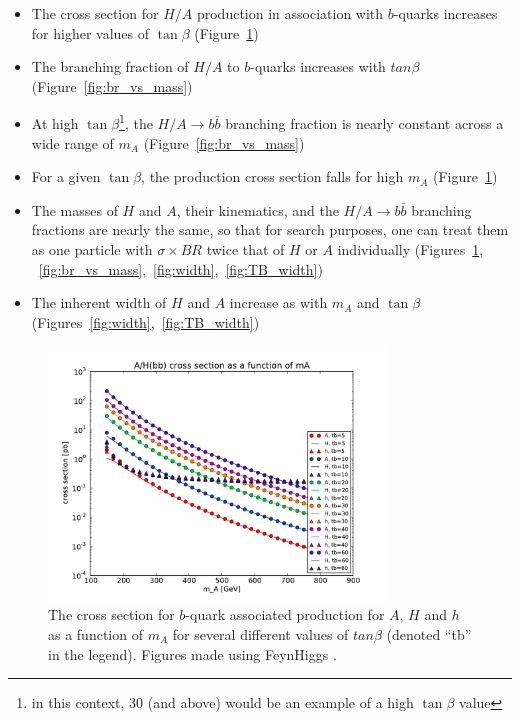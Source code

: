 \begin{itemize}
	\item The cross section for $H/A$ production in association 
        with $b$-quarks increases for higher values of $\tan\beta$ (Figure~\ref{fig:xsec_vs_mass})
	\item The branching fraction of $H/A$ to $b$-quarks increases with $tan\beta$ (Figure~\ref{fig:br_vs_mass})
	\item At high $\tan\beta$\footnote{in this context, 30 (and above) would be an example of a high
        $\tan\beta$ value}, the $H/A\rightarrow b\bar{b}$ branching 
        fraction is nearly constant across a wide range of $m_A$ (Figure~\ref{fig:br_vs_mass})
	\item For a given $\tan\beta$, the production cross section falls for high $m_A$ (Figure~\ref{fig:xsec_vs_mass})
	\item The masses of $H$ and $A$, their kinematics, 
        and the $H/A\rightarrow b\bar{b}$ 
        branching fractions are nearly the same, so that for search purposes, one 
        can treat them as one particle with $\sigma \times BR$ twice 
        that of $H$ or $A$ individually (Figures~\ref{fig:xsec_vs_mass},
        ~\ref{fig:br_vs_mass},~\ref{fig:width},~\ref{fig:TB_width})
	\item The inherent width of $H$ and $A$ increase as with $m_A$ and $\tan\beta$ (Figures~\ref{fig:width},~\ref{fig:TB_width})
\end{itemize}





\begin{figure}
	\centering
	\includegraphics[width=0.8\textwidth]{Theory/figures/mssm_xsec/AH_xsec_vs_mass.pdf}
	\caption{The cross section for $b$-quark associated production for
    $A$, $H$ and $h$ as a function of $m_A$ for several different values of $tan\beta$ (denoted ``tb'' in the legend). 
    Figures made using FeynHiggs \cite{feynhiggs_1, feynhiggs_2, feynhiggs_3, feynhiggs_4, feynhiggs_5}.
    \label{fig:xsec_vs_mass} }
\end{figure}




